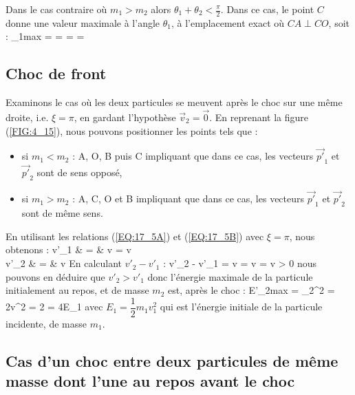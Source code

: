 Dans le cas contraire o\`u $m_{1} > m_{2}$ alors $\theta_{1} + \theta_{2} < \frac{\pi}{2}$. Dans ce cas, le point $C$ donne une valeur maximale \`a l'angle $\theta_{1}$, \`a l'emplacement exact o\`u $CA \perp CO$, soit :
\be
	\sin\theta_{1max} =  =  =  =  \label{EQ:17_8}
\ee

\subsection{Choc de front}

Examinons le cas o\`u les deux particules se meuvent apr\`es le choc sur une m\^eme droite, i.e. $\xi = \pi$, en gardant l'hypoth\`ese $\vec{v}_{2} = \vec{0}$. En reprenant la figure (\ref{FIG:4_15}), nous pouvons positionner les points tels que :
\begin{itemize}
	\item si $m_{1} < m_{2}$ : A, O, B puis C impliquant que dans ce cas, les vecteurs $\vec{p'}_{1}$ et $\vec{p'}_{2}$ sont de sens oppos\'e,
	\item si $m_{1} > m_{2}$ : A, C, O et B impliquant que dans ce cas, les vecteurs $\vec{p'}_{1}$ et $\vec{p'}_{2}$ sont de m\^eme sens.
\end{itemize}
En utilisant les relations (\ref{EQ:17_5A}) et (\ref{EQ:17_5B}) avec $\xi = \pi$, nous obtenons :
\bea
	v'_{1} & = & v = v \nonumber \\
	v'_{2} & = & v \label{EQ:17_6}
\eea
En calculant $v'_{2} - v'_{1}$ :
\benn
	v'_{2} - v'_{1} = v = v = v > 0
\eenn
nous pouvons en d\'eduire que $v'_{2} > v'_{1}$ donc l'\'energie maximale de la particule initialement au repos, et de masse $m_{2}$ est, apr\`es le choc :
\benn
	E'_{2max} = _{2}^{2} = 2v^{2} = 2 = 4E_{1} \label{EQ:17_7}
\eenn
avec $E_{1} = \dfrac{1}{2}m_{1}v_{1}^{2}$ qui est l'\'energie initiale de la particule incidente, de masse $m_{1}$.

\subsection{Cas d'un choc entre deux particules de même masse dont l'une au repos avant le choc}

